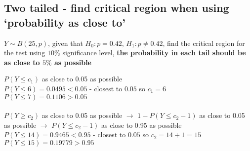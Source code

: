 \subsection{Two tailed - find critical region when using `probability as close to'}
\begin{example}
	$Y \sim B(25, p)$, given that $H_0: p=0.42$, $H_1:p \neq 0.42$, find the critical region for the test using $10\%$ significance level, \textbf{the probability in each tail should be as close to $5\%$ as possible}
\end{example}

\begin{solution}
	$P(Y\leq c_1)$ as close to 0.05 as possible\\
	$P(Y\leq 6) = 0.0495 < 0.05$ - closest to $0.05$ so $c_1 = 6$\\
	$P(Y\leq 7) = 0.1106 > 0.05$\\\\
	
	$P(Y\geq c_2)$ as close to 0.05 as possible $\rightarrow$ $1-P(Y\leq c_2 -1)$ as close to 0.05 as possible $\rightarrow$ $P(Y\leq c_2 -1)$ as close to 0.95 as possible\\
	$P(Y\leq 14) = 0.9465 < 0.95$ - closest to $0.05$ so $c_2 = 14+1 = 15$\\
	$P(Y\leq 15) = 0.19779 > 0.95$
\end{solution}
